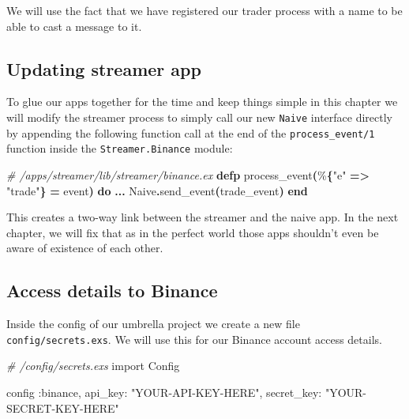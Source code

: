 \documentclass[
  oneside]{book}
\newenvironment{Shaded}{\begin{snugshade}}{\end{snugshade}}
\newcommand{\CommentTok}[1]{\textcolor[rgb]{0.56,0.35,0.01}{\textit{#1}}}
\newcommand{\ConstantTok}[1]{\textcolor[rgb]{0.56,0.35,0.01}{#1}}
\newcommand{\FunctionTok}[1]{\textcolor[rgb]{0.13,0.29,0.53}{\textbf{#1}}}
\newcommand{\ImportTok}[1]{#1}
\newcommand{\KeywordTok}[1]{\textcolor[rgb]{0.13,0.29,0.53}{\textbf{#1}}}
\newcommand{\NormalTok}[1]{#1}
\newcommand{\OperatorTok}[1]{\textcolor[rgb]{0.81,0.36,0.00}{\textbf{#1}}}
\newcommand{\StringTok}[1]{\textcolor[rgb]{0.31,0.60,0.02}{#1}}
\newcommand{\VariableTok}[1]{\textcolor[rgb]{0.00,0.00,0.00}{#1}}
\begin{document}
We will use the fact that we have registered our trader process with a name to be able to cast a message to it.

\newpage

\subsection{Updating streamer app}\label{updating-streamer-app}

To glue our apps together for the time and keep things simple in this chapter we will modify the streamer process to simply call our new \texttt{Naive} interface directly by appending the following function call at the end of the \texttt{process\_event/1} function inside the \texttt{Streamer.Binance} module:

\begin{Shaded}
\begin{Highlighting}[]
  \CommentTok{\# /apps/streamer/lib/streamer/binance.ex}
  \KeywordTok{defp}\NormalTok{ process\_event}\FunctionTok{(}\NormalTok{\%}\FunctionTok{\{}\StringTok{"e"} \OperatorTok{=\textgreater{}} \StringTok{"trade"}\FunctionTok{\}} \OperatorTok{=}\NormalTok{ event}\FunctionTok{)} \KeywordTok{do}
    \OperatorTok{...}
    \ConstantTok{Naive}\OperatorTok{.}\NormalTok{send\_event}\FunctionTok{(}\NormalTok{trade\_event}\FunctionTok{)}
  \KeywordTok{end}
\end{Highlighting}
\end{Shaded}

This creates a two-way link between the streamer and the naive app. In the next chapter, we will fix that as in the perfect world those apps shouldn't even be aware of existence of each other.

\subsection{Access details to Binance}\label{access-details-to-binance}

Inside the config of our umbrella project we create a new file \texttt{config/secrets.exs}. We will use this for our Binance account access details.

\begin{Shaded}
\begin{Highlighting}[]
\CommentTok{\# /config/secrets.exs}
\ImportTok{import} \ConstantTok{Config}

\NormalTok{config }\VariableTok{:binance}\NormalTok{,}
  \VariableTok{api\_key:} \StringTok{"YOUR{-}API{-}KEY{-}HERE"}\NormalTok{,}
  \VariableTok{secret\_key:} \StringTok{"YOUR{-}SECRET{-}KEY{-}HERE"}
\end{Highlighting}
\end{Shaded}
\end{document}
